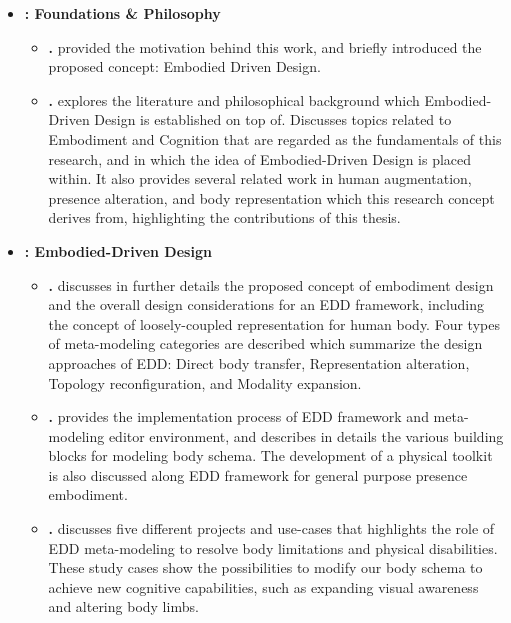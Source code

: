 \begin{itemize}
\item \textbf{: Foundations \& Philosophy}
\begin{itemize}[label={},leftmargin=*]
\item \textbf{.} provided the motivation behind this work, and briefly introduced the proposed concept: Embodied Driven Design.

\item \textbf{.} explores the literature and philosophical background which Embodied-Driven Design is established on top of. Discusses topics related to Embodiment and Cognition that are regarded as the fundamentals of this research, and in which the idea of Embodied-Driven Design is placed within. It also provides several related work in human augmentation, presence alteration, and body representation which this research concept derives from, highlighting the contributions of this thesis.
\end{itemize}

\item \textbf{: Embodied-Driven Design}
\begin{itemize}[label={},leftmargin=*]
\item \textbf{.} discusses in further details the proposed concept of embodiment design and the overall design considerations for an EDD framework, including the concept of loosely-coupled representation for human body. Four types of meta-modeling categories are described which summarize the design approaches of EDD: Direct body transfer, Representation alteration, Topology reconfiguration, and Modality expansion.

\item \textbf{.} provides the implementation process of EDD framework and meta-modeling editor environment, and describes in details the various building blocks for modeling body schema. The development of a physical toolkit is also discussed along EDD framework for general purpose presence embodiment.

\item \textbf{.} discusses five different projects and use-cases that highlights the role of EDD meta-modeling to resolve body limitations and physical disabilities. These study cases show the possibilities to modify our body schema to achieve new cognitive capabilities, such as expanding visual awareness and altering body limbs. 


\end{itemize}
\end{itemize}

